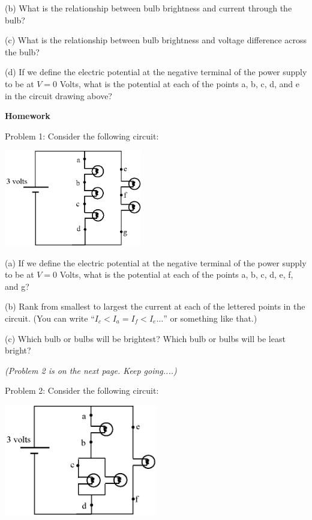 (b) What is the relationship between bulb brightness and current through the bulb?
\answerspace{0.5 in}

(c) What is the relationship between bulb brightness and voltage difference across the bulb?
\answerspace{0.5 in}

\pagebreak[2]
(d) If we define the electric potential at the negative terminal of the power supply to be at $V=0$ Volts, what is the potential at each of the points a, b, c, d, and e in the circuit drawing above?  
\answerspace{0.6 in}

\textbf{Homework}

Problem 1: Consider the following circuit:

\begin{center}
\includegraphics[width=0.45\textwidth]{electric_circuits/circ_diag6.eps}
\end{center}
\vspace{-0.1in}

(a) If we define the electric potential at the negative terminal of the power supply to be at $V=0$ Volts, what is the potential at each of the points a, b, c, d, e, f, and g?  
\answerspace{0.7 in}

(b) Rank from smallest to largest the current at each of the lettered points in the circuit.   (You can write ``$I_c<I_a=I_f<I_e…$'' or something like that.) 
\answerspace{0.7 in}

(c) Which bulb or bulbs will be brightest?  Which bulb or bulbs will be least bright?
\answerspace{1.7 in}

\textit{(Problem 2 is on the next page.  Keep going....)}

\pagebreak[2]
Problem 2: Consider the following circuit:

\begin{center}
\includegraphics[width=0.5\textwidth]{electric_circuits/circ_diag7.eps}
\end{center}
\vspace{-0.1in}

